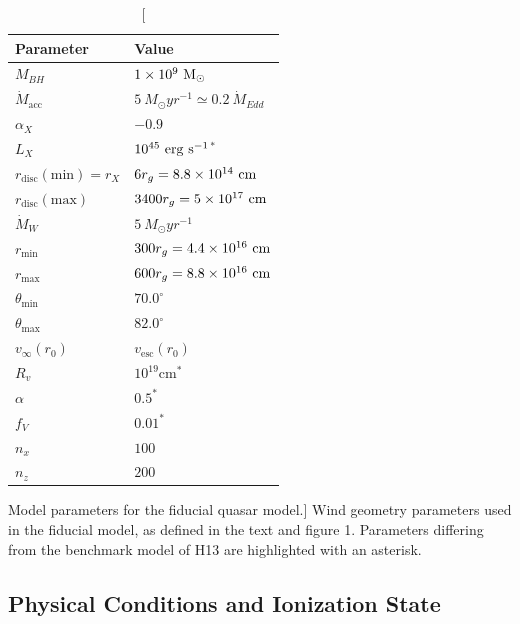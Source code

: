 \begin{table}
\centering
\begin{tabular}{p{3cm}p{4cm}}
\hline Parameter 	&	 Value \\ 
\hline \hline 
$M_{BH}$ 	 &	 $1\times 10^9~\rm{M_{\odot}}$ \\ 
$\dot{M}_{\mathrm{acc}}$ 	 &	 $5~M_{\odot}yr^{-1} \simeq 0.2~\dot{M}_{Edd}$\\ 
$\alpha_X$ 	 &	 $-0.9$ \\ 
$L_{X} $ 	 &	 $10^{45}~\rm{erg~s^{-1}}$$^*$ \\ 
$r_{\mathrm{disc}}(\mathrm{min})=r_{X}$   &	 $6r_g=8.8\times10^{14}~{\rm cm}$ \\ 
$r_{\mathrm{disc}}(\mathrm{max})$   &	 $3400r_g = 5\times10^{17}~{\rm cm}$ \\ 
$\dot{M}_W$  &	 $5~M_{\odot}yr^{-1}$ \\ 
$r_{\mathrm{min}}$ 	&	 $300r_{g} = 4.4\times10^{16}~{\rm cm}$\\ 
$r_{\mathrm{max}}$ 	&	 $600r_{g} = 8.8\times10^{16}~{\rm cm}$ \\ 
$\theta_{\mathrm{min}}$ 	&	 $70.0^{\circ}$ \\ 
$\theta_{\mathrm{max}}$ 	&	 $82.0^{\circ}$ \\ 
$v_{\infty}(r_0)$ 	&	 $v_{\mathrm{esc}}(r_0)$ \\ 
$R_v$  	        &	 $10^{19}$cm$^*$ \\ 
$\alpha$ 	&	 $0.5^*$ \\
$f_V$ 	&	 $0.01^*$  \\
$n_x$ 	&	 $100$  \\
$n_z$ 	&	 $200$  \\
\hline 
\end{tabular}
\caption
[Model parameters for the fiducial quasar model.]
{Wind geometry parameters 
used in the fiducial model, as defined in the text and figure 1.
Parameters differing from the benchmark model of H13 are 
highlighted with an asterisk.}
\label{wind_param}
\end{table}



\subsection{Physical Conditions and Ionization State}


